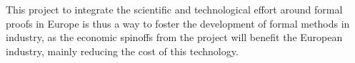 This project to integrate the scientific and technological effort
around formal proofs in Europe is thus a way to foster the
development of formal methods in industry, as the economic spinoffs
from the project will benefit the European industry, mainly reducing
the cost of this technology.

